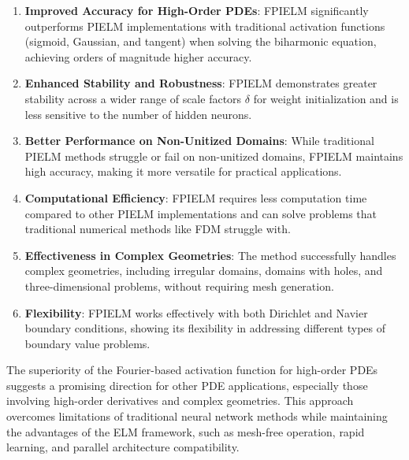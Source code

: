 \documentclass[11pt]{article}
\begin{document}
\begin{enumerate}
    \item \textbf{Improved Accuracy for High-Order PDEs}: FPIELM significantly outperforms PIELM implementations with traditional activation functions (sigmoid, Gaussian, and tangent) when solving the biharmonic equation, achieving orders of magnitude higher accuracy.
    
    \item \textbf{Enhanced Stability and Robustness}: FPIELM demonstrates greater stability across a wider range of scale factors $\delta$ for weight initialization and is less sensitive to the number of hidden neurons.
    
    \item \textbf{Better Performance on Non-Unitized Domains}: While traditional PIELM methods struggle or fail on non-unitized domains, FPIELM maintains high accuracy, making it more versatile for practical applications.
    
    \item \textbf{Computational Efficiency}: FPIELM requires less computation time compared to other PIELM implementations and can solve problems that traditional numerical methods like FDM struggle with.
    
    \item \textbf{Effectiveness in Complex Geometries}: The method successfully handles complex geometries, including irregular domains, domains with holes, and three-dimensional problems, without requiring mesh generation.
    
    \item \textbf{Flexibility}: FPIELM works effectively with both Dirichlet and Navier boundary conditions, showing its flexibility in addressing different types of boundary value problems.
\end{enumerate}

The superiority of the Fourier-based activation function for high-order PDEs suggests a promising direction for other PDE applications, especially those involving high-order derivatives and complex geometries. This approach overcomes limitations of traditional neural network methods while maintaining the advantages of the ELM framework, such as mesh-free operation, rapid learning, and parallel architecture compatibility.
\end{document}
